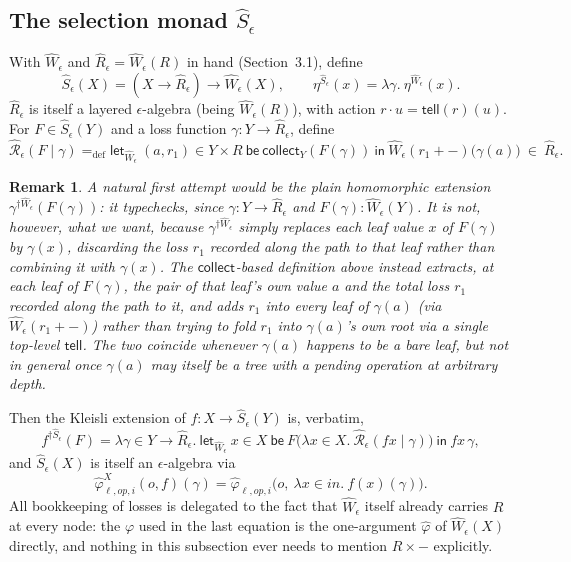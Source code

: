 \documentclass[11pt]{article}
\theoremstyle{plain}
\newtheorem{remark}[theorem]{Remark}
\newcommand{\Wm}[1]{\widehat{W}_{#1}}
\newcommand{\Rm}[1]{\widehat{R}_{#1}}
\newcommand{\Sm}[1]{\widehat{S}_{#1}}
\newcommand{\eps}{\epsilon}
\newcommand{\dg}[1]{^{\dagger #1}}
\newcommand{\op}{\mathit{op}}
\newcommand{\tell}{\mathsf{tell}}
\newcommand{\collectX}[1]{\mathsf{collect}_{#1}}
\newcommand{\Rx}[1]{\widehat{\mathcal R}_{#1}}
\begin{document}
\subsection{The selection monad $\Sm\eps$}

With $\Wm\eps$ and $\Rm\eps=\Wm\eps(R)$ in hand (Section~3.1), define
\[
  \widehat S_\eps(X) = (X\to \Rm\eps)\to \Wm\eps(X), \qquad
  \eta^{\widehat S_\eps}(x) = \lambda\gamma.\ \eta^{\Wm\eps}(x).
\]
$\Rm\eps$ is itself a layered $\eps$-algebra (being $\Wm\eps(R)$), with action
$r\cdot u = \tell(r)(u)$. For $F\in\widehat S_\eps(Y)$ and a loss function
$\gamma:Y\to\Rm\eps$, define
\[
  \Rx\eps(F\mid\gamma) =_{\mathrm{def}}
     \mathsf{let}_{\Wm\eps}\ (a,r_1)\in Y\times R\ \mathsf{be}\ \collectX Y(F(\gamma))\ \mathsf{in}\
     \Wm\eps(r_1+{-})\big(\gamma(a)\big) \ \in\ \Rm\eps.
\]
\begin{remark}
A natural first attempt would be the plain homomorphic extension
$\gamma\dg{\Wm\eps}(F(\gamma))$: it typechecks, since $\gamma:Y\to\Rm\eps$ and
$F(\gamma):\Wm\eps(Y)$. It is not, however, what we want, because $\gamma\dg{\Wm\eps}$
simply replaces each leaf value $x$ of $F(\gamma)$ by $\gamma(x)$, discarding the loss
$r_1$ recorded along the path to that leaf rather than combining it with $\gamma(x)$. The
$\collectX{}$-based definition above instead extracts, at each leaf of $F(\gamma)$, the pair
of that leaf's own value $a$ and the total loss $r_1$ recorded along the path to it, and adds
$r_1$ into \emph{every} leaf of $\gamma(a)$ (via $\Wm\eps(r_1+{-})$) rather than trying to fold
$r_1$ into $\gamma(a)$'s own root via a single top-level $\tell$. The two coincide whenever
$\gamma(a)$ happens to be a bare leaf, but not in general once $\gamma(a)$ may itself be a
tree with a pending operation at arbitrary depth.
\end{remark}
Then the Kleisli extension of $f:X\to\widehat S_\eps(Y)$ is, verbatim,
\[
  f\dg{\widehat S_\eps}(F) = \lambda\gamma\in Y\to\Rm\eps.\
     \mathsf{let}_{\Wm\eps}\ x\in X\ \mathsf{be}\ F\big(\lambda x\in X.\ \Rx\eps(fx\mid\gamma)\big)\ \mathsf{in}\ fx\,\gamma,
\]
and $\widehat S_\eps(X)$ is itself an $\eps$-algebra via
\[
  \widehat\varphi^X_{\ell,\op,i}(o,f)(\gamma) = \widehat\varphi_{\ell,\op,i}\big(o,\ \lambda x\in\mathit{in}.\ f(x)(\gamma)\big).
\]
All bookkeeping of losses is delegated to the fact that $\Wm\eps$ itself already carries
$R$ at every node: the $\varphi$ used in the last equation is the one-argument
$\widehat\varphi$ of $\Wm\eps(X)$ directly, and nothing in this subsection ever needs to
mention $R\times -$ explicitly.
\end{document}
